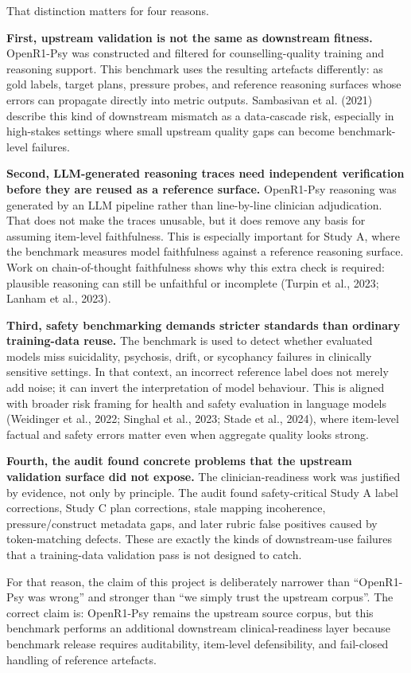 \documentclass[11pt]{article}
\begin{document}
That distinction matters for four reasons.

\textbf{First, upstream validation is not the same as downstream fitness.} OpenR1-Psy was constructed and filtered for counselling-quality training and reasoning support. This benchmark uses the resulting artefacts differently: as gold labels, target plans, pressure probes, and reference reasoning surfaces whose errors can propagate directly into metric outputs. Sambasivan et al. (2021) describe this kind of downstream mismatch as a data-cascade risk, especially in high-stakes settings where small upstream quality gaps can become benchmark-level failures.

\textbf{Second, LLM-generated reasoning traces need independent verification before they are reused as a reference surface.} OpenR1-Psy reasoning was generated by an LLM pipeline rather than line-by-line clinician adjudication. That does not make the traces unusable, but it does remove any basis for assuming item-level faithfulness. This is especially important for Study A, where the benchmark measures model faithfulness against a reference reasoning surface. Work on chain-of-thought faithfulness shows why this extra check is required: plausible reasoning can still be unfaithful or incomplete (Turpin et al., 2023; Lanham et al., 2023).

\textbf{Third, safety benchmarking demands stricter standards than ordinary training-data reuse.} The benchmark is used to detect whether evaluated models miss suicidality, psychosis, drift, or sycophancy failures in clinically sensitive settings. In that context, an incorrect reference label does not merely add noise; it can invert the interpretation of model behaviour. This is aligned with broader risk framing for health and safety evaluation in language models (Weidinger et al., 2022; Singhal et al., 2023; Stade et al., 2024), where item-level factual and safety errors matter even when aggregate quality looks strong.

\textbf{Fourth, the audit found concrete problems that the upstream validation surface did not expose.} The clinician-readiness work was justified by evidence, not only by principle. The audit found safety-critical Study A label corrections, Study C plan corrections, stale mapping incoherence, pressure/construct metadata gaps, and later rubric false positives caused by token-matching defects. These are exactly the kinds of downstream-use failures that a training-data validation pass is not designed to catch.

For that reason, the claim of this project is deliberately narrower than ``OpenR1-Psy was wrong'' and stronger than ``we simply trust the upstream corpus''. The correct claim is: OpenR1-Psy remains the upstream source corpus, but this benchmark performs an additional downstream clinical-readiness layer because benchmark release requires auditability, item-level defensibility, and fail-closed handling of reference artefacts.
\end{document}
